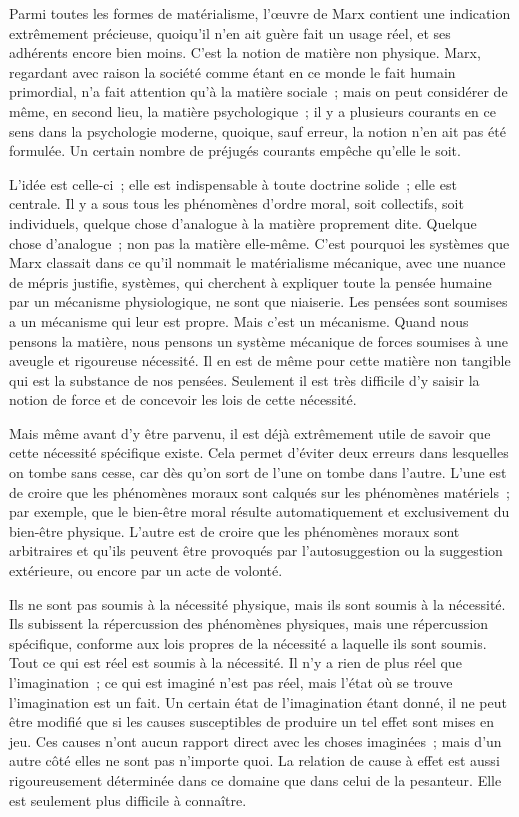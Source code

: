 \documentclass[french,twoside]{book} %
\begin{document}
Parmi toutes les formes de matérialisme, l'œuvre de Marx contient une indication extrêmement précieuse, quoiqu'il n'en ait guère fait un usage réel, et ses adhérents encore bien moins. C'est la notion de matière non physique. Marx, regardant avec raison la société comme étant en ce monde le fait humain primordial, n’a fait attention qu'à la matière sociale ; mais on peut considérer de même, en second lieu, la matière psychologique ; il y a plusieurs courants en ce sens dans la psychologie moderne, quoique, sauf erreur, la notion n’en ait pas été formulée. Un certain nombre de préjugés courants empêche qu'elle le soit.\par
L'idée est celle-ci ; elle est indispensable à toute doctrine solide ; elle est centrale. Il y a sous tous les phénomènes d'ordre moral, soit collectifs, soit individuels, quelque chose d’analogue à la matière proprement dite. Quelque chose d'analogue ; non pas la matière elle-même. C'est pourquoi les systèmes que Marx classait dans ce qu'il nommait le matérialisme mécanique, avec une nuance de mépris justifie, systèmes, qui cherchent à expliquer toute la pensée humaine par un mécanisme physiologique, ne sont que niaiserie. Les pensées sont soumises a un mécanisme qui leur est propre. Mais c'est un mécanisme. Quand nous pensons la matière, nous pensons un système mécanique de forces soumises à une aveugle et rigoureuse nécessité. Il en est de même pour cette matière non tangible qui est la substance de nos pensées. Seulement il est très difficile d'y saisir la notion de force et de concevoir les lois de cette nécessité.\par
Mais même avant d'y être parvenu, il est déjà extrêmement utile de savoir que cette nécessité spécifique existe. Cela permet d'éviter deux erreurs dans lesquelles on tombe sans cesse, car dès qu'on sort de l’une on tombe dans l'autre. L'une est de croire que les phénomènes moraux sont calqués sur les phénomènes matériels ; par exemple, que le bien-être moral résulte automatiquement et exclusivement du bien-être physique. L'autre est de croire que les phénomènes moraux sont arbitraires et qu'ils peuvent être provoqués par l'autosuggestion ou la suggestion extérieure, ou encore par un acte de volonté.\par
Ils ne sont pas soumis à la nécessité physique, mais ils sont soumis à la nécessité. Ils subissent la répercussion des phénomènes physiques, mais une répercussion spécifique, conforme aux lois propres de la nécessité a laquelle ils sont soumis. Tout ce qui est réel est soumis à la nécessité. Il n'y a rien de plus réel que l'imagination ; ce qui est imaginé n'est pas réel, mais l'état où se trouve l'imagination est un fait. Un certain état de l'imagination étant donné, il ne peut être modifié que si les causes susceptibles de produire un tel effet sont mises en jeu. Ces causes n'ont aucun rapport direct avec les choses imaginées ; mais d'un autre côté elles ne sont pas n'importe quoi. La relation de cause à effet est aussi rigoureusement déterminée dans ce domaine que dans celui de la pesanteur. Elle est seulement plus difficile à connaître.\par
\end{document}
